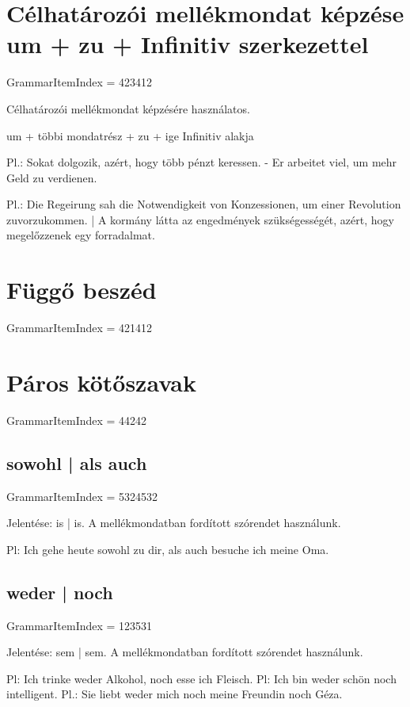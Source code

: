 \documentclass{article}
\newenvironment{desc}{\verbatim}{\endverbatim}
\begin{document}
\section{Célhatározói mellékmondat képzése um + zu + Infinitiv szerkezettel}

GrammarItemIndex = 423412

\begin{desc}
Célhatározói mellékmondat képzésére használatos.

um + többi mondatrész + zu + ige Infinitiv alakja

Pl.: Sokat dolgozik, azért, hogy több pénzt keressen. - Er arbeitet viel, um mehr Geld zu verdienen.

Pl.: Die Regeirung sah die Notwendigkeit von Konzessionen, um einer Revolution zuvorzukommen. | A kormány látta az engedmények szükségességét, azért, hogy megelőzzenek egy forradalmat.
\end{desc}

\section{Függő beszéd}

GrammarItemIndex = 421412

\section{Páros kötőszavak}

GrammarItemIndex = 44242

\subsection{sowohl | als auch}

GrammarItemIndex = 5324532

\begin{desc}
Jelentése: is | is. A mellékmondatban fordított szórendet használunk.

Pl: Ich gehe heute sowohl zu dir, als auch besuche ich meine Oma. 
\end{desc}

\subsection{weder | noch}

GrammarItemIndex = 123531

\begin{desc}
Jelentése: sem | sem. A mellékmondatban fordított szórendet használunk.

Pl: Ich trinke weder Alkohol, noch esse ich Fleisch.
Pl: Ich bin weder schön noch intelligent.
Pl.: Sie liebt weder mich noch meine Freundin noch Géza.
\end{desc}
\end{document}
